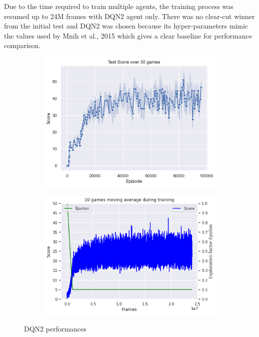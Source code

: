 \documentclass{article}
\begin{document}
Due to the time required to train multiple agents, the training process was resumed up to 24M frames with DQN2 agent only. There was no clear-cut winner from the initial test and DQN2 was chosen because its hyper-parameters mimic the values used by Mnih et al., 2015 which gives a clear baseline for performance comparison.
\begin{figure}[H]
\centering
\begin{subfigure}{0.49\textwidth}
\centering
\includegraphics[scale=0.39]{DQNTestScore.PNG}
\end{subfigure}
\begin{subfigure}{0.49\textwidth}
\centering
\includegraphics[scale=0.39]{DQNMovAvgTraining.PNG}
\end{subfigure}
\caption{DQN2 performances}
\label{fig:DQN2}
\end{figure}
\end{document}
